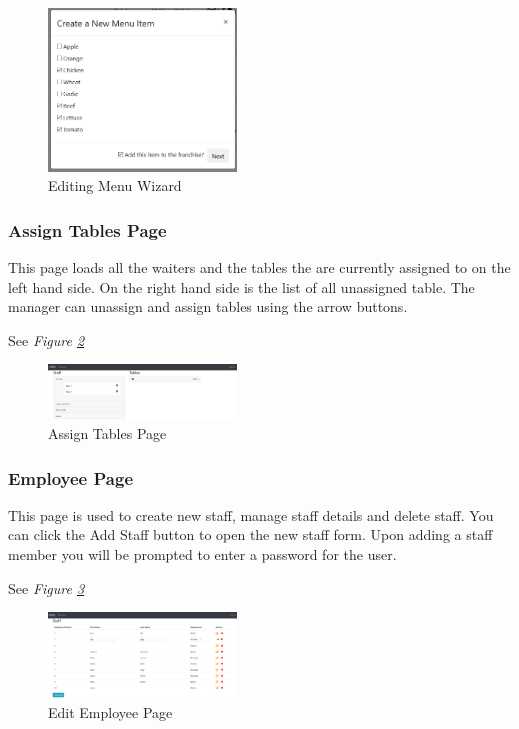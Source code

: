 \documentclass[12pt, twoside, a4paper]{report}
\begin{document}
\begin{figure}[H]
  \centering
  \includegraphics[width=5cm]{editWizard3.png}
  \caption{Editing Menu Wizard}
  \label{fig:editWizard3}
\end{figure}

\subsubsection*{Assign Tables Page}
This page loads all the waiters and the tables the are currently assigned to on the left hand side. On the right hand side is the list of all unassigned table.
The manager can unassign and assign tables using the arrow buttons.

See \textit{Figure \ref{fig:assign}}

\begin{figure}[H]
  \centering
  \includegraphics[width=5cm]{assignTables.png}
  \caption{Assign Tables Page}
  \label{fig:assign}
\end{figure}

\subsubsection*{Employee Page}
This page is used to create new staff, manage staff details and delete staff. You can click the Add Staff button to open the new staff form. Upon adding a staff member you will be prompted to enter a password for the user.

See \textit{Figure \ref{fig:employee1}}

\begin{figure}[H]
  \centering
  \includegraphics[width=5cm]{employee1.png}
  \caption{Edit Employee Page}
  \label{fig:employee1}
\end{figure}
\end{document}
